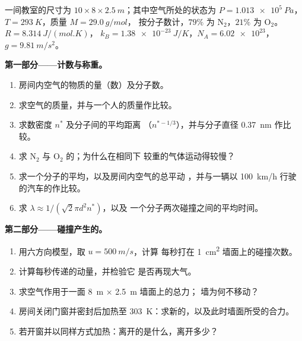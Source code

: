 \begin{problem}
\label{pb:b1:kinetic-theory:1}
一间教室的尺寸为 $10 \times 8 \times \qty{2.5}{m}$；其中空气所处的状态为
$P = \qty{1.013e5}{Pa}$，$T = \qty{293}{K}$，质量 $M = \qty{29.0}{g/mol}$，
按分子数计，$79\%$ 为 N$_2$，$21\%$ 为 O$_2$。$R = \qty{8.314}{J/(mol.K)}$，
$k_B = \qty{1.38e-23}{J/K}$，$N_A = \num{6.02e23}$，$g = \qty{9.81}{m/s^2}$。

\medskip
\noindent\textbf{第一部分——计数与称重。}
\begin{enumerate}
  \item 房间内空气的物质的量（数）及分子数。
  \item 求空气的质量，并与一个人的质量作比较。
  \item 求数密度 $n^*$ 及分子间的平均距离
        （$n^{*-1/3}$），并与分子直径 \qty{0.37}{nm} 作比较。
  \item 求 N$_2$ 与 O$_2$ 的；为什么在相同下
        较重的气体运动得较慢？
  \item 求一个分子的平均，以及房间内空气的总平动
        ，并与一辆以
        \qty{100}{km/h} 行驶的汽车的作比较。
  \item 求 $\lambda \approx 1/(\sqrt2\pi d^2n^*)$，以及
        一个分子两次碰撞之间的平均时间。
\end{enumerate}

\medskip
\noindent\textbf{第二部分——碰撞产生的。}
\begin{enumerate}[resume]
  \item 用六方向模型，取 $u = \qty{500}{m/s}$，计算
        每秒打在 \qty{1}{cm^2} 墙面上的碰撞次数。
  \item 计算每秒传递的动量，并检验它
        是否再现大气。
  \item 求空气作用于一面 \qty{8}{m} × \qty{2.5}{m} 墙面上的总力；
        墙为何不移动？
  \item 房间关闭门窗并密封后加热至
        \qty{303}{K}：求新的，以及此时墙面所受的合力。
  \item 若开窗并以同样方式加热：离开的是什么，离开多少？
\end{enumerate}


\end{problem}
